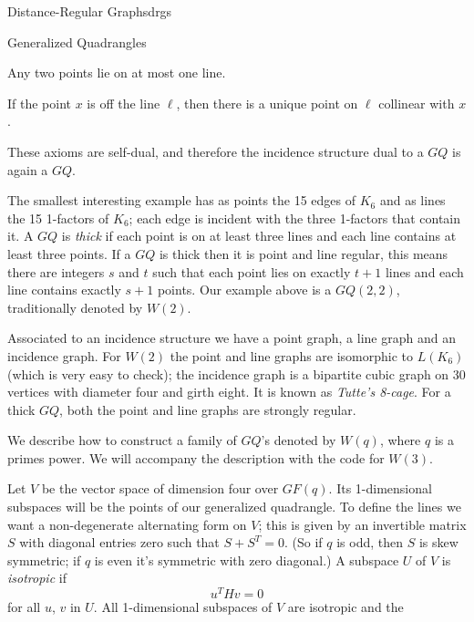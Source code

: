 \begin{chap}{Distance-Regular Graphs}{drgs}
\begin{sect}{Generalized Quadrangles}
\begin{enumerate}
\begin{listitem}
    Any two points lie on at most one line.
    \end{listitem}
    \begin{listitem}
    If the point $x$ is off the line $\ell$, then there is a unique
    point on $\ell$ collinear with $x$.
    \end{listitem}
\end{enumerate}
%
\begin{para}
These axioms are self-dual, and therefore the incidence structure
dual to a $GQ$ is again a $GQ$.
\end{para}
%
\begin{para}
The smallest interesting example has as points the 15 edges of $K_6$ and
as lines the 15 1-factors of $K_6$; each edge is incident with the three
1-factors that contain it. A $GQ$ is \textsl{thick} if each point is on at least 
three lines and each line contains at least three points. If a $GQ$ is thick then
it is point and line regular, this means there are integers $s$ and $t$ such that
each point lies on exactly $t+1$ lines and each line contains exactly $s+1$
points. Our example above is a $GQ(2,2)$, traditionally denoted by $W(2)$.
\end{para}
%
\begin{para}
Associated to an incidence structure we have a point graph, a line graph
and an incidence graph.  For $W(2)$ the point and line graphs are isomorphic
to $L(K_6)$ (which is very easy to check); the incidence graph is
a bipartite cubic graph on 30 vertices with diameter four and girth eight.
It is known as \textsl{Tutte's 8-cage}. For a thick $GQ$, both the point
and line graphs are strongly regular.
\end{para}
%
\begin{para}
We describe how to construct a family of $GQ$'s denoted by $W(q)$, where
$q$ is a primes power. We will accompany the description with the
code for $W(3)$.
\end{para}
%
\begin{para}
Let $V$ be the vector space of dimension four over $GF(q)$. Its 1-dimensional
subspaces will be the points of our generalized quadrangle. To define
the lines we want a non-degenerate alternating form on $V$; this is
given by an invertible matrix $S$ with diagonal entries zero such that $S+S^T=0$.
(So if $q$ is odd, then $S$ is skew symmetric; if $q$ is even it's symmetric
with zero diagonal.) A subspace $U$ of $V$ is \textsl{isotropic}
if
\[
    u^THv = 0
\]
for all $u$, $v$ in $U$. All 1-dimensional subspaces of $V$ are isotropic and the

\end{para}
\end{sect}
\end{chap}
